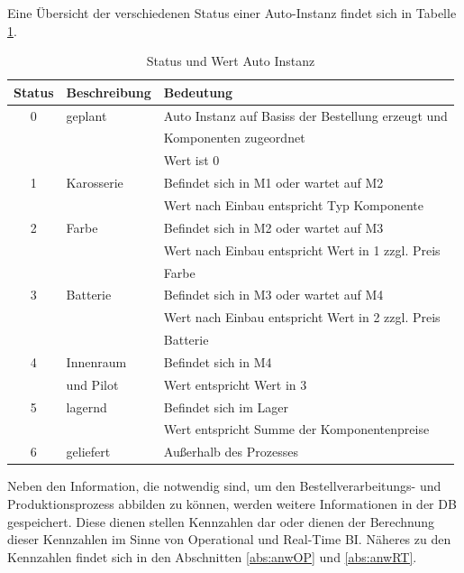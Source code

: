 Eine Übersicht der verschiedenen Status einer Auto-Instanz findet sich in Tabelle \ref{tab:status}.
\begin{table}[H]
    \centering
    \begin{tabular}{|c|l|l|}
     \toprule
     \hline
         \textbf{Status}& \textbf{Beschreibung} & \textbf{Bedeutung} \\ \hline
          0 & geplant & Auto Instanz auf Basiss der Bestellung erzeugt und\\
           &&Komponenten zugeordnet\\
           &&Wert ist 0\\ \hline
          1 & Karosserie & Befindet sich in M1 oder wartet auf M2\\
          &&Wert nach Einbau entspricht Typ Komponente\\ \hline
          2 & Farbe & Befindet sich in M2 oder wartet auf M3\\
          &&Wert nach Einbau entspricht Wert in 1 zzgl. Preis \\
          &&Farbe\\ \hline
          3 & Batterie & Befindet sich in M3 oder wartet auf M4\\
          &&Wert nach Einbau entspricht Wert in 2 zzgl. Preis \\
          &&Batterie\\ \hline
          4 & Innenraum & Befindet sich in M4\\
          &und Pilot&Wert entspricht Wert in 3\\ \hline
          5 & lagernd& Befindet sich im Lager\\
          &&Wert entspricht Summe der Komponentenpreise\\ \hline
          6 & geliefert& Außerhalb des Prozesses\\ \hline
    \bottomrule
    \end{tabular}
    \caption{Status und Wert Auto Instanz}
    \label{tab:status}
\end{table}
Neben den Information, die notwendig sind, um den Bestellverarbeitungs- und Produktionsprozess abbilden zu können, werden weitere Informationen in der \ac{DB} gespeichert. Diese dienen stellen Kennzahlen dar oder dienen der Berechnung dieser Kennzahlen im Sinne von Operational und Real-Time \ac{BI}. Näheres zu den Kennzahlen findet sich in den Abschnitten \ref{abs:anwOP} und \ref{abs:anwRT}.

